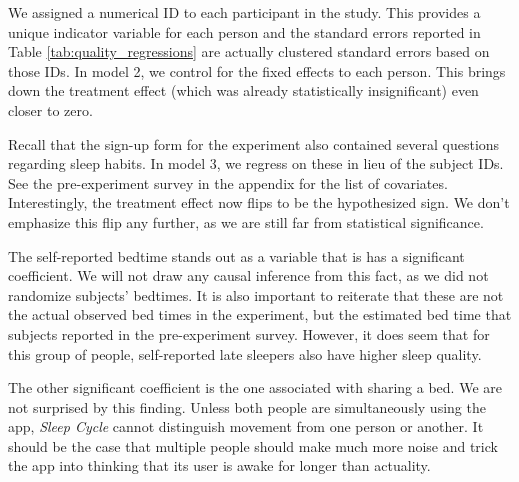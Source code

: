 \documentclass[12pt,]{article}
\begin{document}
We assigned a numerical ID to each participant in the study. This
provides a unique indicator variable for each person and the standard
errors reported in Table \ref{tab:quality_regressions} are actually
clustered standard errors based on those IDs. In model 2, we control for
the fixed effects to each person. This brings down the treatment effect
(which was already statistically insignificant) even closer to zero.

Recall that the sign-up form for the experiment also contained several
questions regarding sleep habits. In model 3, we regress on these in
lieu of the subject IDs. See the pre-experiment survey in the appendix
for the list of covariates. Interestingly, the treatment effect now
flips to be the hypothesized sign. We don't emphasize this flip any
further, as we are still far from statistical significance.

The self-reported bedtime stands out as a variable that is has a
significant coefficient. We will not draw any causal inference from this
fact, as we did not randomize subjects' bedtimes. It is also important
to reiterate that these are not the actual observed bed times in the
experiment, but the estimated bed time that subjects reported in the
pre-experiment survey. However, it does seem that for this group of
people, self-reported late sleepers also have higher sleep quality.

The other significant coefficient is the one associated with sharing a
bed. We are not surprised by this finding. Unless both people are
simultaneously using the app, \emph{Sleep Cycle} cannot distinguish
movement from one person or another. It should be the case that multiple
people should make much more noise and trick the app into thinking that
its user is awake for longer than actuality.
\end{document}
